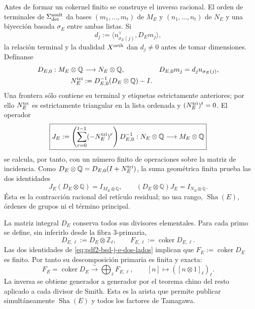 Antes de formar un cokernel finito se construye el inverso racional. El orden
de terminales de $\Sigma_{\rm det}^{\rm mult}$ da bases
$(m_1,\ldots,m_t)$ de $M_E$ y $(n_1,\ldots,n_t)$ de $N_E$ y una biyección
basada $\sigma_E$ entre ambas listas. Si
\[
 d_j:=\bigl\langle n_{\sigma_E(j)}^\vee,D_Em_j\bigr\rangle,
\]
la relación terminal y la dualidad $X^{\rm orth}$ dan $d_j\ne0$ antes de
tomar dimensiones. Defínanse
\begin{equation}\label{eq:pdf2-bsd-d0-nilpotente}
 \begin{aligned}
  D_{E,0}:M_E\otimes\mathbb Q&\longrightarrow N_E\otimes\mathbb Q,
  &D_{E,0}m_j&=d_jn_{\sigma_E(j)},\\
  N_E^{\rm tri}&:=D_{E,0}^{-1}(D_E\otimes\mathbb Q)-I.
 \end{aligned}
\end{equation}
Una frontera sólo contiene su terminal y etiquetas estrictamente anteriores;
por ello $N_E^{\rm tri}$ es estrictamente triangular en la lista ordenada y
$(N_E^{\rm tri})^t=0$. El operador
\begin{equation}\label{eq:pdf2-bsd-j-e-inverso-racional}
 \boxed{
 J_E:=\left(\sum_{r=0}^{t-1}(-N_E^{\rm tri})^r\right)D_{E,0}^{-1}:
 N_E\otimes\mathbb Q\longrightarrow M_E\otimes\mathbb Q }
\end{equation}
se calcula, por tanto, con un número finito de operaciones sobre la matriz de
incidencia. Como
$D_E\otimes\mathbb Q=D_{E,0}(I+N_E^{\rm tri})$, la suma geométrica finita
prueba las dos identidades
\begin{equation}\label{eq:pdf2-bsd-j-e-dos-lados}
 J_E(D_E\otimes\mathbb Q)=I_{M_E\otimes\mathbb Q},
 \qquad
 (D_E\otimes\mathbb Q)J_E=I_{N_E\otimes\mathbb Q}.
\end{equation}
Ésta es la contracción racional del retículo residual; no usa rango,
$\operatorname{Sha}(E)$, órdenes de grupos ni el término principal.

La matriz integral $D_E$ conserva todos sus divisores elementales. Para cada
primo se define, sin inferirlo desde la fibra $3$-primaria,
\begin{equation}\label{eq:pdf2-bsd-f-ell-def}
 D_{E,\ell}:=D_E\otimes\mathbb Z_\ell,
 \qquad
 F_{E,\ell}:=\operatorname{coker}D_{E,\ell}.
\end{equation}
Las dos identidades de \eqref{eq:pdf2-bsd-j-e-dos-lados} implican que
$F_E:=\operatorname{coker}D_E$ es finito. Por tanto su
descomposición primaria es finita y exacta:
\begin{equation}\label{eq:pdf2-bsd-f-descomposicion-primaria}
 F_E=\operatorname{coker}D_E
 \xrightarrow{\ \sim\ }
 \bigoplus_{\ell}F_{E,\ell},
 \qquad
 [n]\longmapsto([n\otimes1]_\ell)_\ell.
\end{equation}
La inversa se obtiene generador a generador por el teorema chino del resto
aplicado a cada divisor de Smith. Esta es la arista que permite publicar
simultáneamente $\operatorname{Sha}(E)$ y todos los factores de Tamagawa.

